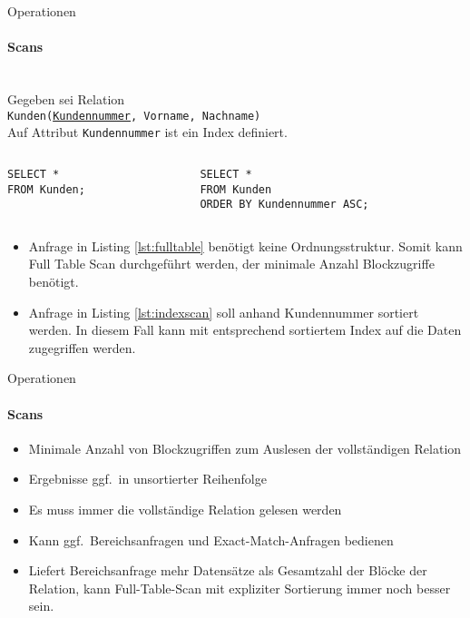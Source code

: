 \begin{frame}[fragile]{Operationen}
\framesubtitle{Scans}
\\[6pt]
Gegeben sei Relation 
\\[4pt]
\texttt{Kunden(\uline{Kundennummer}, Vorname, Nachname)}
\\[4pt]
Auf Attribut \texttt{Kundennummer} ist ein Index definiert.
\begin{columns}[b]
	\lstset{captionpos=b}
	\begin{column}{.48\textwidth}
	\begin{lstlisting}[caption=Full Table Scan, xleftmargin=2ex, label=lst:fulltable]
SELECT * 
FROM Kunden; 
	\end{lstlisting}
	\end{column}
	\begin{column}{.48\textwidth}
	\begin{lstlisting}[caption=Index Scan, label=lst:indexscan]
SELECT * 
FROM Kunden
ORDER BY Kundennummer ASC; 
		\end{lstlisting}
	\end{column}
\end{columns}
\pause
\begin{itemize}
	\item Anfrage in Listing \ref{lst:fulltable} ben\"otigt keine Ordnungsstruktur. Somit kann Full Table Scan durchgeführt werden, 
	der minimale Anzahl Blockzugriffe benötigt.
	\pause
	\item Anfrage in Listing \ref{lst:indexscan} soll anhand Kundennummer sortiert werden. 
	In diesem Fall kann mit entsprechend sortiertem Index auf die Daten zugegriffen werden. 
\end{itemize} 
\end{frame}

\begin{frame}[fragile]{Operationen}
\framesubtitle{Scans}
	\begin{itemize}
		\item Minimale Anzahl von Blockzugriffen zum Auslesen der vollständigen Relation
		\item Ergebnisse ggf.~in unsortierter Reihenfolge 
		\item Es muss immer die vollständige Relation gelesen werden
	\end{itemize}
\pause
	\begin{itemize}
		\item Kann ggf.~Bereichsanfragen und Exact-Match-Anfragen bedienen 
		\item Liefert Bereichsanfrage mehr Datens\"atze als Gesamtzahl der Blöcke der Relation, kann 
		Full-Table-Scan mit expliziter Sortierung immer noch besser sein.
	\end{itemize}
\end{frame}

